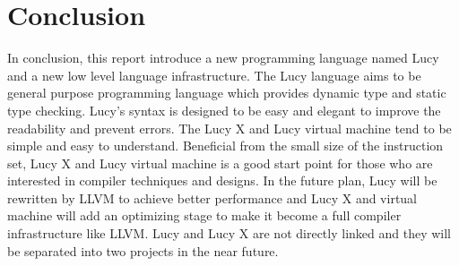 \chapter{Conclusion}

In conclusion, this report introduce a new programming language named Lucy and a new low level language infrastructure. The Lucy language aims to be general purpose programming language which provides dynamic type and static type checking. Lucy's syntax is designed to be easy and elegant to improve the readability and prevent errors. The Lucy X and Lucy virtual machine tend to be simple and easy to understand. Beneficial from the small size of the instruction set, Lucy X and Lucy virtual machine is a good start point for those who are interested in compiler techniques and designs. In the future plan, Lucy will be rewritten by LLVM to achieve better performance and Lucy X and virtual machine will add an optimizing stage to make it become a full compiler infrastructure like LLVM. Lucy and Lucy X are not directly linked and they will be separated into two projects in the near future.
